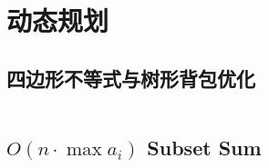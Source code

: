 \section{动态规划}
\subsection{四边形不等式与树形背包优化}
  \inputminted{cpp}{src/Miscellany/2D1D.cpp}
  
\subsection{$O(n \cdot \max a_i)$ Subset Sum}
  \inputminted{cpp}{src/yzh/Subset Sum.cpp}
